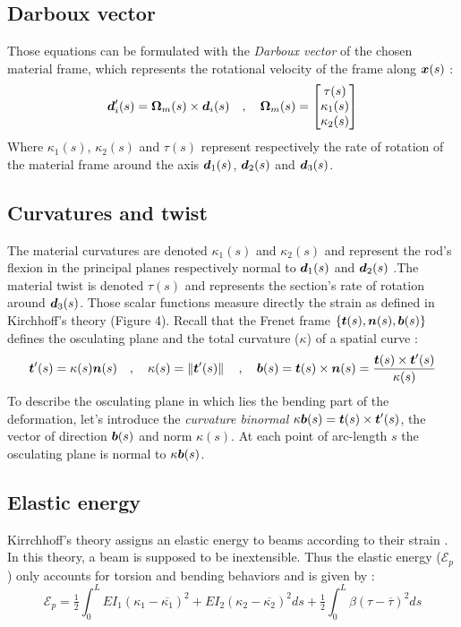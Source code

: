 \subsection{Darboux vector}
Those equations can be formulated with the \emph{Darboux vector} of the chosen material frame, which represents the rotational velocity of the frame along $\boldsymbol{x}(s)$ :
\begin{gather}
	\boldsymbol{d}'_{i}(s) = \boldsymbol{\Omega}_m(s) \times \boldsymbol{d}_i(s)
	\quad,\quad
	\boldsymbol{\Omega}_m(s) 
	= 
	\begin{bmatrix}
		\tau(s) \\
		\kappa_{1}(s) \\
		\kappa_{2}(s)
	\end{bmatrix}
\end{gather}
Where $\kappa_1(s)$, $\kappa_2(s)$ and $\tau(s)$ represent respectively the rate of rotation of the material frame around the axis  $\boldsymbol{d}_1 (s)$, $\boldsymbol{d}_2 (s)$ and $\boldsymbol{d}_3 (s)$.

\subsection{Curvatures and twist}
The material curvatures are denoted $\kappa_1(s)$ and $\kappa_2(s)$ and represent the rod’s flexion in the principal planes respectively normal to $\boldsymbol{d}_1(s)$ and $\boldsymbol{d}_2(s)$ .The material twist is denoted $\tau(s)$ and represents the section’s rate of rotation around $\boldsymbol{d}_3(s)$. Those scalar functions measure directly the strain as defined in Kirchhoff’s theory (Figure 4). Recall that the Frenet frame $\{\boldsymbol{t}(s),\boldsymbol{n}(s),\boldsymbol{b}(s)\}$ defines the osculating plane and the total curvature ($\kappa$) of a spatial curve :
\begin{equation}
	\boldsymbol{t}'(s) = \kappa(s) \boldsymbol{n}(s)
	\quad,\quad
	\kappa(s) = \left\|\boldsymbol{t}'(s)\right\|
	\quad,\quad
	\boldsymbol{b}(s) = \boldsymbol{t}(s) \times \boldsymbol{n}(s) = \frac{\boldsymbol{t}(s) \times \boldsymbol{t}'(s)}{\kappa(s)} 
\end{equation}
To describe the osculating plane in which lies the bending part of the deformation, let’s introduce the \emph{curvature binormal} $\kappa\boldsymbol{b}(s) = \boldsymbol{t}(s)\times\boldsymbol{t}'(s)$, the vector of direction $\boldsymbol{b}(s)$ and norm $\kappa(s)$. At each point of arc-length $s$ the osculating plane is normal to $\kappa\boldsymbol{b}(s)$.

\subsection{Elastic energy}
Kirrchhoff’s theory assigns an elastic energy to beams according to their strain \cite{Audoly2010}. In this theory, a beam is supposed to be inextensible. Thus the elastic energy ($\mathcal{E}_p$) only accounts for torsion and bending behaviors and is given by :
\begin{equation}
	\mathcal{E}_{p} = 
	\tfrac{1}{2} \int_{0}^{L}EI_1(\kappa_1-\overbar{\kappa_1})^2 + EI_2(\kappa_2-\overbar{\kappa_2})^2 ds
	+ \tfrac{1}{2} \int_{0}^{L} \beta(\tau -{\overbar{\tau}})^2 ds
\end{equation}

